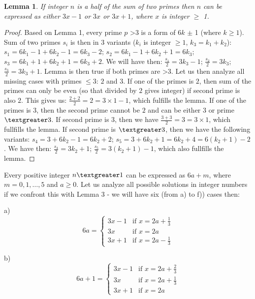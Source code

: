 \documentclass[10pt,twocolumn]{article}
\newtheorem{lemma}[theorem]{Lemma}
\begin{document}
\begin{lemma}
If integer $n$ is a half of the sum of two primes then $n$ can be expressed as either $3x - 1$ or $3x$ or $3x + 1$, where $x$ is integer $\geq$ 1.
\end{lemma}
\begin{proof}
Based on Lemma 1, every prime $p$ \textgreater 3 is a form of 6$k$ $\pm$ 1 (where $k \geq 1$). Sum of two primes $s_i$ is then in $3$ variants ($k_i$ is integer $\geq 1$, $k_3 = k_1 + k_2$): $s_1 = 6k_1 - 1 + 6k_2 - 1 = 6k_3 - 2$; $s_2 = 6k_1 - 1 + 6k_2 + 1 = 6k_3$; $s_3 = 6k_1 + 1 + 6k_2 + 1 = 6k_3 + 2$. We will have then: $\frac{s_1}{2} = 3k_3 - 1$; $\frac{s_2}{2} = 3k_3$; $\frac{s_3}{2} = 3k_3 + 1$. Lemma is then true if both primes are \textgreater 3. Let us then analyze all missing cases with primes $\leq 3$: $2$ and $3$. If one of the primes is $2$, then sum of the primes can only be even (so that divided by $2$ gives integer) if second prime is also $2$. This gives us: $\frac{2 + 2}{2} = 2 = 3 \times 1 - 1$, which fulfills the lemma. If one of the primes is $3$, then the second prime cannot be $2$ and can be either $3$ or prime $\textgreater 3$. If second prime is $3$, then we have $\frac{3+3}{2} = 3 = 3 \times 1$, which fullfills the lemma. If second prime is $\textgreater 3$, then we have the following variants: $s_4 = 3 + 6k_2 - 1 = 6k_2 + 2$; $s_5 = 3 + 6k_2 + 1 = 6k_2 + 4 = 6(k_2 + 1) - 2$. We have then: $\frac{s_4}{2} = 3k_2 + 1$;  $\frac{s_5}{2} = 3(k_2 + 1) - 1$, which also fullfills the lemma.
\end{proof}

Every positive integer $n \textgreater 1$ can be expressed as $6a+m$, where $m=0, 1, \ldots, 5$ and $a \geq 0$. Let us analyze all possible solutions in integer numbers if we confront this with Lemma 3 - we will have six (from a) to f)) cases then:

a)
$$
6a = \left\{ \begin{array}{ll}
3x - 1 & \textrm{if $x = 2a + \frac{1}{3}$}\\
3x & \textrm{if $x = 2a$}\\
3x + 1 & \textrm{if $x = 2a - \frac{1}{3}$}
\end{array} \right.
$$

b)
$$
6a + 1 = \left\{ \begin{array}{ll}
3x - 1 & \textrm{if $x = 2a + \frac{2}{3}$}\\
3x & \textrm{if $x = 2a + \frac{1}{3}$}\\
3x + 1 & \textrm{if $x = 2a$}
\end{array} \right.
$$
\end{document}
